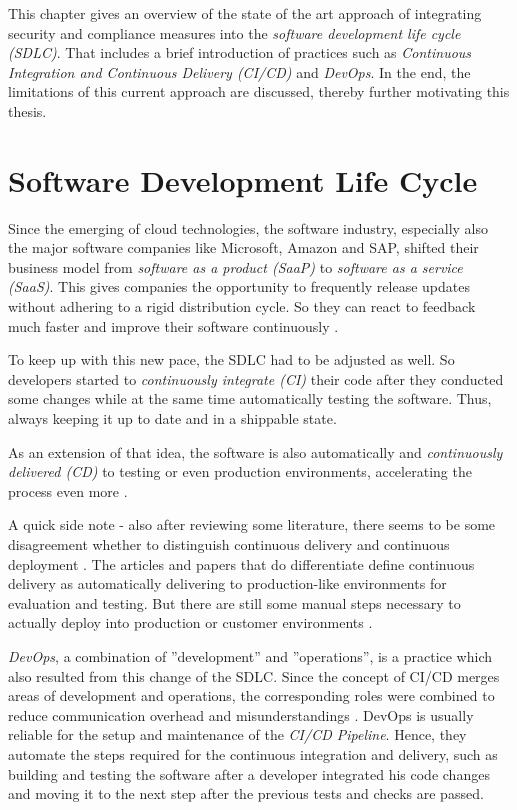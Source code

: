 
This chapter gives an overview of the state of the art approach of integrating security and compliance measures into the \textit{software development life cycle (SDLC)}. That includes a brief introduction of practices such as \textit{Continuous Integration and Continuous Delivery (CI/CD)} and \textit{DevOps}. In the end, the limitations of this current approach are discussed, thereby further motivating this thesis. 

\section{Software Development Life Cycle}
Since the emerging of cloud technologies, the software industry, especially also the major software companies like Microsoft, Amazon and SAP, shifted their business model from \textit{software as a product (SaaP)} to \textit{software as a service (SaaS)}. This gives companies the opportunity to frequently release updates without adhering to a rigid distribution cycle. So they can react to feedback much faster and improve their software continuously \cite{DevSecOps, ContinuousSecurity}.\par
To keep up with this new pace, the SDLC had to be adjusted as well. So developers started to \emph{continuously integrate (CI)} their code after they conducted some changes while at the same time automatically testing the software. Thus, always keeping it up to date and in a shippable state.\par
As an extension of that idea, the software is also automatically and \emph{continuously delivered (CD)} to testing or even production environments, accelerating the process even more \cite{CICD}.\par 
A quick side note - also after reviewing some literature, there seems to be some disagreement whether to distinguish continuous delivery and continuous deployment \cite{CICD, DevSecOps}. The articles and papers that do differentiate define continuous delivery as automatically delivering to production-like environments for evaluation and testing. But there are still some manual steps necessary to actually deploy into production or customer environments \cite{CICD, CICDDebate1, SecureCloudApplications}.\par
\emph{DevOps}, a combination of ''development'' and ''operations'', is a practice which also resulted from this change of the SDLC. Since the concept of CI/CD merges areas of development and operations, the corresponding roles were combined to reduce communication overhead and misunderstandings \cite{SecureCloudApplications}. DevOps is usually reliable for the setup and maintenance of the \emph{CI/CD Pipeline}. Hence, they automate the steps required for the continuous integration and delivery, such as building and testing the software after a developer integrated his code changes and moving it to the next step after the previous tests and checks are passed. 

